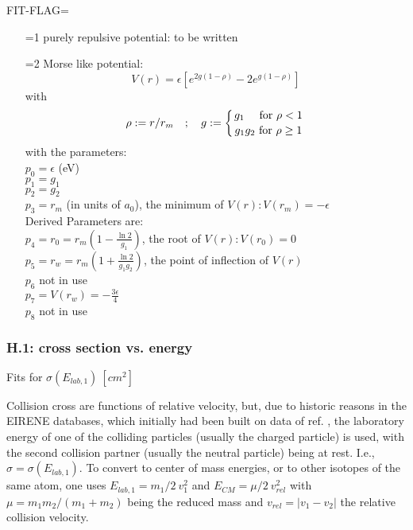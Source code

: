 \documentclass[12pt,dvipdfmx]{article}
\begin{document}
FIT-FLAG=
\begin{itemize}
\item [=1]
purely repulsive potential: to be written
\item [=2]
Morse like potential:\\
\begin{equation}\nonumber
V(r) = \epsilon \left[e^{2g(1-\rho)}-2 e^{g(1-\rho)}\right]
\end{equation}
with
\begin{equation}
 \rho:= r/r_m \quad; \quad g:=\left\{ {g_1  \ \  \ \ \mbox{for} \ \rho < 1 \atop g_1g_2
\ \mbox{for} \
 \rho \geq 1} \right.
\end{equation}
with the parameters:\\  $p_0=\epsilon$ (eV)\\ $p_1=g_1$\\ $p_2=g_2
$\\ $p_3=r_m $ (in units of $a_0$), the minimum of $V(r): V(r_m)=-\epsilon$\\
Derived Parameters are: \\
$p_4=r_0=r_m\left(1-\frac{\ln 2}{g_1}\right)$, the root of $V(r):
V(r_0)=0$\\
$p_5=r_w=r_m\left(1+\frac{\ln 2}{g_1g_2}\right)$, the point of
inflection of $V(r)$\\
$p_6$  not in use\\
$p_7  = V(r_w)=-\frac{3\epsilon}{4}$ \\
$p_8$  not in use
\end{itemize}
\subsubsection{H.1: cross section vs. energy}\label{sec1.3.1}
Fits for $\sigma  (E_{lab,1}) \ [cm^2]$

Collision cross are functions of relative velocity, but, due to historic reasons
in the EIRENE databases, which initially had been built on data of ref. \cite{kn:Janev}, the laboratory energy  of one of the colliding particles (usually the charged particle)
is used, with the second collision partner (usually the neutral particle) being at rest. I.e., $\sigma= \sigma(E_{lab,1})$.
To convert to center of mass energies, or to other isotopes of the same atom, one uses $E_{lab,1} =m_1/2 \ v_1^2$ and $E_{CM} = \mu/2 \ v_{rel}^2$ with
$\mu = m_1m_2/(m_1+m_2)$ being the reduced mass and $v_{rel}=|v_1-v_2|$ the relative collision velocity.
\end{document}
